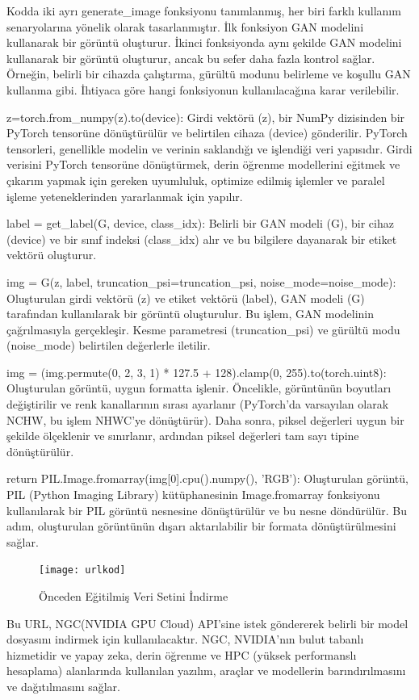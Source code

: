 \documentclass[12pt, a4paper]{article}
\begin{document}
	Kodda iki ayrı generate\_image fonksiyonu tanımlanmış, her biri farklı kullanım senaryolarına yönelik olarak tasarlanmıştır. İlk fonksiyon GAN modelini kullanarak bir görüntü oluşturur. İkinci fonksiyonda aynı şekilde GAN modelini kullanarak bir görüntü oluşturur, ancak bu sefer daha fazla kontrol sağlar. Örneğin, belirli bir cihazda çalıştırma, gürültü modunu belirleme ve koşullu GAN kullanma gibi. İhtiyaca göre hangi fonksiyonun kullanılacağına karar verilebilir.
	
	z=torch.from\_numpy(z).to(device): Girdi vektörü (z), bir NumPy dizisinden bir PyTorch tensorüne dönüştürülür ve belirtilen cihaza (device) gönderilir. PyTorch tensorleri, genellikle modelin ve verinin saklandığı ve işlendiği veri yapısıdır.
	Girdi verisini PyTorch tensorüne dönüştürmek, derin öğrenme modellerini eğitmek ve çıkarım yapmak için gereken uyumluluk, optimize edilmiş işlemler ve paralel işleme yeteneklerinden yararlanmak için yapılır.
	
	label = get\_label(G, device, class\_idx): Belirli bir GAN modeli (G), bir cihaz (device) ve bir sınıf indeksi (class\_idx) alır ve bu bilgilere dayanarak bir etiket vektörü oluşturur.
	
	img = G(z, label, truncation\_psi=truncation\_psi, noise\_mode=noise\_mode): Oluşturulan girdi vektörü (z) ve etiket vektörü (label), GAN modeli (G) tarafından kullanılarak bir görüntü oluşturulur. Bu işlem, GAN modelinin çağrılmasıyla gerçekleşir. Kesme parametresi (truncation\_psi) ve gürültü modu (noise\_mode) belirtilen değerlerle iletilir.
	
	img = (img.permute(0, 2, 3, 1) * 127.5 + 128).clamp(0, 255).to(torch.uint8): Oluşturulan görüntü, uygun formatta işlenir. Öncelikle, görüntünün boyutları değiştirilir ve renk kanallarının sırası ayarlanır (PyTorch'da varsayılan olarak NCHW, bu işlem NHWC'ye dönüştürür). Daha sonra, piksel değerleri uygun bir şekilde ölçeklenir ve sınırlanır, ardından piksel değerleri tam sayı tipine dönüştürülür.
	
	return PIL.Image.fromarray(img[0].cpu().numpy(), 'RGB'): Oluşturulan görüntü, PIL (Python Imaging Library) kütüphanesinin Image.fromarray fonksiyonu kullanılarak bir PIL görüntü nesnesine dönüştürülür ve bu nesne döndürülür. Bu adım, oluşturulan görüntünün dışarı aktarılabilir bir formata dönüştürülmesini sağlar.
	
	\begin{figure}[h]
		\centering
		\texttt{[image: urlkod]}
		\label{urlkod}
		\caption{Önceden Eğitilmiş Veri Setini İndirme}
	\end{figure}
	\FloatBarrier
	Bu URL, NGC(NVIDIA GPU Cloud) API'sine\cite{NVIDIA-2024-04-18} istek göndererek belirli bir model dosyasını indirmek için kullanılacaktır. NGC, NVIDIA'nın bulut tabanlı hizmetidir ve yapay zeka, derin öğrenme ve HPC (yüksek performanslı hesaplama) alanlarında kullanılan yazılım, araçlar ve modellerin barındırılmasını ve dağıtılmasını sağlar.
	
\end{document}
